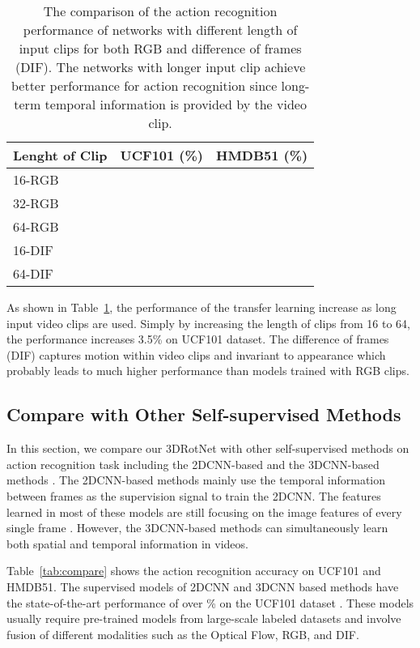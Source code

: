 \documentclass[10pt,twocolumn,letterpaper]{article}
\begin{document}
\begin{table}[!h]
\begin{center}
\begin{tabular}{l|c|c}
\hline
Lenght of Clip & UCF101 (\%)    & HMDB51 (\%)\\
\hline\hline
16-RGB         &      & \\
32-RGB         &      & \\
64-RGB         &      & \\
\hline
16-DIF         &      & \\
64-DIF         &      & \\
\hline
\end{tabular}
\end{center}
\caption{The comparison of the action recognition performance of networks with different length of input clips for both RGB and difference of frames (DIF). The networks with longer input clip achieve better performance for action recognition since long-term temporal information is provided by the video clip.}
\label{tab:long_temporal}
\end{table}


As shown in Table~\ref{tab:long_temporal}, the performance of the transfer learning increase as long input video clips are used. Simply by increasing the length of clips from 16 to 64, the performance increases 3.5\% on UCF101 dataset. The difference of frames (DIF) captures motion within video clips and invariant to appearance which probably leads to much higher performance than models trained with RGB clips. 

\subsection{Compare with Other Self-supervised Methods}

In this section, we compare our 3DRotNet with other self-supervised methods on action recognition task including the 2DCNN-based \cite{hadsell2006dimensionality, shuffleandlearn, mobahi2009deep, wang2015unsupervised, AOT} and the 3DCNN-based methods \cite{videogan, CubicPuzzles}. The 2DCNN-based methods mainly use the temporal information between frames as the supervision signal to train the 2DCNN. The features learned in most of these models are still focusing on the image features of every single frame \cite{wang2015unsupervised, shuffleandlearn}. However, the 3DCNN-based methods can simultaneously learn both spatial and temporal information in videos. 


Table~\ref{tab:compare} shows the action recognition accuracy on UCF101 and HMDB51. The supervised models of 2DCNN and 3DCNN based methods have the state-of-the-art performance of over \% on the UCF101 dataset \cite{3DResNet, I3D, P3D, TSN}. These models usually require pre-trained models from large-scale labeled datasets and involve fusion of different modalities such as the Optical Flow, RGB, and DIF.
\end{document}
